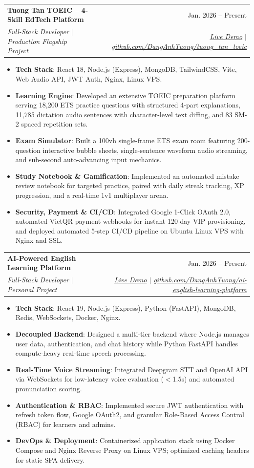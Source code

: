 \documentclass[letterpaper,10pt]{article}
\makeatletter
\newcommand{\resumeItem}[1]{
  \item\small{
    {#1 \vspace{-2.2pt}}
  }
}
\newcommand{\resumeSubheading}[4]{
  \vspace{-2.5pt}\item
    \begin{tabular*}{\textwidth}[t]{l@{\extracolsep{\fill}}r}
      \textbf{#1} & #2 \\
      \textit{\small#3} & \textit{\small #4} \\
    \end{tabular*}\vspace{-5.5pt}
}
\newcommand{\resumeItemListStart}{\begin{itemize}[leftmargin=0.15in]}
\newcommand{\resumeItemListEnd}{\end{itemize}\vspace{-4pt}}
\makeatother
\begin{document}
    \resumeSubheading
      {Tuong Tan TOEIC -- 4-Skill EdTech Platform}{Jan. 2026 -- Present}
      {Full-Stack Developer $|$ Production Flagship Project}{\href{https://toeic.danganhtuong.dev}{Live Demo} $|$ \href{https://github.com/DangAnhTuong/tuong_tan_toeic}{github.com/DangAnhTuong/tuong\_tan\_toeic}}
      \resumeItemListStart
        \resumeItem{\textbf{Tech Stack}: React 18, Node.js (Express), MongoDB, TailwindCSS, Vite, Web Audio API, JWT Auth, Nginx, Linux VPS.}
        \resumeItem{\textbf{Learning Engine}: Developed an extensive TOEIC preparation platform serving 18,200 ETS practice questions with structured 4-part explanations, 11,785 dictation audio sentences with character-level text diffing, and 83 SM-2 spaced repetition sets.}
        \resumeItem{\textbf{Exam Simulator}: Built a 100vh single-frame ETS exam room featuring 200-question interactive bubble sheets, single-sentence waveform audio streaming, and sub-second auto-advancing input mechanics.}
        \resumeItem{\textbf{Study Notebook \& Gamification}: Implemented an automated mistake review notebook for targeted practice, paired with daily streak tracking, XP progression, and a real-time 1v1 multiplayer arena.}
        \resumeItem{\textbf{Security, Payment \& CI/CD}: Integrated Google 1-Click OAuth 2.0, automated VietQR payment webhooks for instant 120-day VIP provisioning, and deployed automated 5-step CI/CD pipeline on Ubuntu Linux VPS with Nginx and SSL.}
      \resumeItemListEnd

    \resumeSubheading
      {AI-Powered English Learning Platform}{Jan. 2026 -- Present}
      {Full-Stack Developer $|$ Personal Project}{\href{https://english.danganhtuong.dev}{Live Demo} $|$ \href{https://github.com/DangAnhTuong/ai-english-learning-platform}{github.com/DangAnhTuong/ai-english-learning-platform}}
      \resumeItemListStart
        \resumeItem{\textbf{Tech Stack}: React 19, Node.js (Express), Python (FastAPI), MongoDB, Redis, WebSockets, Docker, Nginx.}
        \resumeItem{\textbf{Decoupled Backend}: Designed a multi-tier backend where Node.js manages user data, authentication, and chat history while Python FastAPI handles compute-heavy real-time speech processing.}
        \resumeItem{\textbf{Real-Time Voice Streaming}: Integrated Deepgram STT and OpenAI API via WebSockets for low-latency voice evaluation ($<$1.5s) and automated pronunciation scoring.}
        \resumeItem{\textbf{Authentication \& RBAC}: Implemented secure JWT authentication with refresh token flow, Google OAuth2, and granular Role-Based Access Control (RBAC) for learners and admins.}
        \resumeItem{\textbf{DevOps \& Deployment}: Containerized application stack using Docker Compose and Nginx Reverse Proxy on Linux VPS; optimized caching headers for static SPA delivery.}
      \resumeItemListEnd
\end{document}
